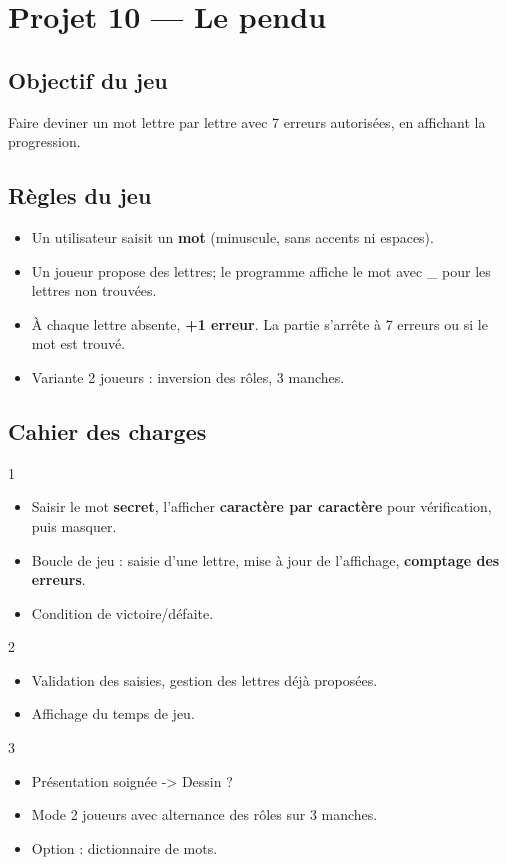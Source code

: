 \section{Projet 10 — Le pendu}
\setcounter{UPSTInumeroCahier des charges}{0}

\subsection*{Objectif du jeu}
Faire deviner un mot lettre par lettre avec 7 erreurs autorisées, en affichant la progression.

\subsection*{Règles du jeu}
\begin{itemize}
  \item Un utilisateur saisit un \textbf{mot} (minuscule, sans accents ni espaces).
  \item Un joueur propose des lettres; le programme affiche le mot avec \_ pour les lettres non trouvées.
  \item À chaque lettre absente, \textbf{+1 erreur}. La partie s’arrête à 7 erreurs ou si le mot est trouvé.
  \item Variante 2 joueurs : inversion des rôles, 3 manches.
\end{itemize}

\subsection*{Cahier des charges}
\begin{UPSTICahierDesCharges}{1}
\begin{itemize}
  \item Saisir le mot \textbf{secret}, l’afficher \textbf{caractère par caractère} pour vérification, puis masquer.
  \item Boucle de jeu : saisie d’une lettre, mise à jour de l’affichage, \textbf{comptage des erreurs}.
  \item Condition de victoire/défaite.
\end{itemize}
\end{UPSTICahierDesCharges}

\begin{UPSTICahierDesCharges}{2}
\begin{itemize}
  \item Validation des saisies, gestion des lettres déjà proposées.
  \item Affichage du temps de jeu.
\end{itemize}
\end{UPSTICahierDesCharges}

\begin{UPSTICahierDesCharges}{3}
\begin{itemize}
  \item Présentation soignée -> Dessin ?
  \item Mode 2 joueurs avec alternance des rôles sur 3 manches.
  \item Option : dictionnaire de mots.
\end{itemize}
\end{UPSTICahierDesCharges}

